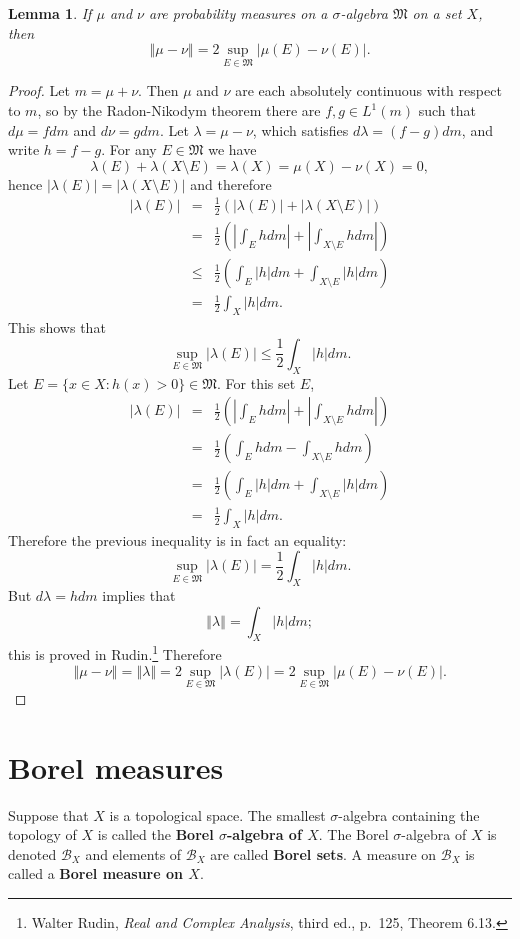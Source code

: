 \documentclass{article}
\newcommand{\norm}[1]{\left\Vert #1 \right\Vert}
\newtheorem{lemma}[theorem]{Lemma}
\theoremstyle{definition}
\begin{document}
\begin{lemma}
If $\mu$ and $\nu$ are probability measures on a $\sigma$-algebra $\mathfrak{M}$ on a set $X$, then 
\[
\norm{\mu-\nu} = 2\sup_{E \in \mathfrak{M}} |\mu(E)-\nu(E)|.
\]
\label{totvariationmetric}
\end{lemma}
\begin{proof}
Let $m=\mu+\nu$. Then $\mu$ and $\nu$ are each absolutely continuous with respect to $m$, so
by the Radon-Nikodym theorem there are $f,g \in L^1(m)$ such that 
$d\mu = f dm$ and $d\nu = g dm$. 
Let $\lambda=\mu-\nu$, which satisfies $d\lambda = (f-g) dm$, and write $h=f-g$. 
For any $E \in \mathfrak{M}$ we have
\[
\lambda(E)+\lambda(X \setminus E) = \lambda(X) = \mu(X) - \nu(X) = 0,
\]
hence $|\lambda(E)|=|\lambda(X \setminus E)|$ and therefore
\begin{eqnarray*}
|\lambda(E)|&=&\frac{1}{2}(|\lambda(E)|+|\lambda(X \setminus E)|)\\
&=&\frac{1}{2}\left(\left| \int_E h dm\right|+\left|\int_{X \setminus E} h dm\right| \right)\\
&\leq&\frac{1}{2}\left( \int_E |h| dm + \int_{X \setminus E} |h| dm\right)\\
&=&\frac{1}{2}\int_X |h| dm.
\end{eqnarray*}
This shows that
\[
\sup_{E \in \mathfrak{M}} |\lambda(E)| \leq \frac{1}{2}\int_X |h| dm.
\]
Let $E=\{x \in X: h(x)>0\} \in \mathfrak{M}$. For this set $E$,
\begin{eqnarray*}
|\lambda(E)|&=&\frac{1}{2}\left(\left| \int_E h dm\right|+\left|\int_{X \setminus E} h dm\right| \right)\\
&=&\frac{1}{2}\left( \int_E h dm - \int_{X \setminus E}  h dm\right)\\
&=&\frac{1}{2}\left( \int_E |h| dm + \int_{X \setminus E} |h| dm\right)\\
&=&\frac{1}{2} \int_X |h| dm.
\end{eqnarray*}
Therefore the previous inequality is in fact an equality:
\[
\sup_{E \in \mathfrak{M}} |\lambda(E)| = \frac{1}{2}\int_X |h| dm.
\]
But  $d\lambda = h dm$ implies that
\[
\norm{\lambda} = \int_X |h| dm;
\]
this is proved in Rudin.\footnote{Walter Rudin, {\em Real and Complex Analysis}, third ed., p.~125, Theorem 6.13.}
Therefore
\[
\norm{\mu-\nu}=\norm{\lambda}=2\sup_{E \in \mathfrak{M}} |\lambda(E)| = 2 \sup_{E \in \mathfrak{M}} |\mu(E)-\nu(E)|.
\]
\end{proof}


\section{Borel measures}
Suppose that $X$ is a topological space. The smallest $\sigma$-algebra containing the topology of $X$ is called
the \textbf{Borel $\sigma$-algebra of $X$}. The Borel $\sigma$-algebra of $X$ is denoted $\mathscr{B}_X$ and elements of $\mathscr{B}_X$
are called \textbf{Borel sets}. 
A measure on $\mathscr{B}_X$ is called a \textbf{Borel measure on $X$}.
\end{document}
